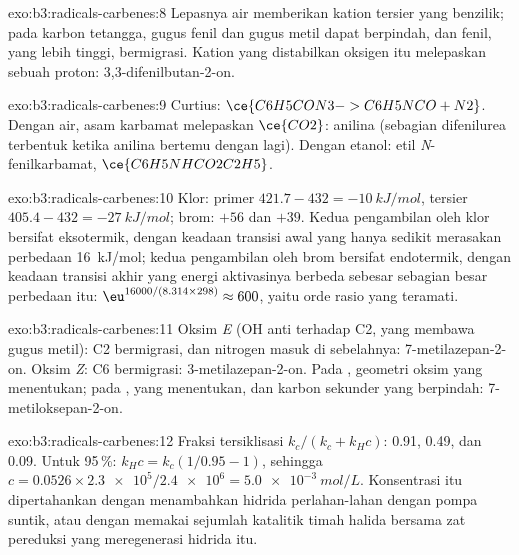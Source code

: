 \begin{solution}{exo:b3:radicals-carbenes:8}
Lepasnya air memberikan kation tersier yang benzilik; pada karbon tetangga, gugus fenil
dan gugus metil dapat berpindah, dan fenil, yang  lebih tinggi, bermigrasi. Kation
yang distabilkan oksigen itu melepaskan sebuah proton: 3,3-difenilbutan-2-on.
\end{solution}

\begin{solution}{exo:b3:radicals-carbenes:9}
Curtius: $\ce{C6H5CON3 -> C6H5NCO + N2}$. Dengan air, asam karbamat melepaskan $\ce{CO2}$: anilina
(sebagian difenilurea terbentuk ketika anilina bertemu dengan  lagi). Dengan etanol: etil
\textit{N}-fenilkarbamat, $\ce{C6H5NHCO2C2H5}$.
\end{solution}

\begin{solution}{exo:b3:radicals-carbenes:10}
Klor: primer $421.7 - 432 = \qty{-10}{kJ/mol}$, tersier $405.4 - 432 = \qty{-27}{kJ/mol}$; brom: $+56$ dan
$+39$. Kedua pengambilan oleh klor bersifat eksotermik, dengan keadaan transisi awal yang
hanya sedikit merasakan perbedaan \qty{16}{kJ/mol}; kedua pengambilan oleh brom bersifat endotermik,
dengan keadaan transisi akhir yang energi aktivasinya berbeda sebesar sebagian besar perbedaan itu:
$\eu^{16000/(8.314 \times 298)} \approx 600$, yaitu orde rasio yang teramati.
\end{solution}

\begin{solution}{exo:b3:radicals-carbenes:11}
Oksim \textit{E} (OH anti terhadap C2, yang membawa gugus metil): C2 bermigrasi, dan nitrogen masuk
di sebelahnya: 7-metilazepan-2-on. Oksim \textit{Z}: C6 bermigrasi: 3-metilazepan-2-on. Pada
, geometri oksim yang menentukan; pada ,  yang menentukan, dan karbon sekunder yang berpindah:
7-metiloksepan-2-on.
\end{solution}

\begin{solution}{exo:b3:radicals-carbenes:12}
Fraksi tersiklisasi $k_c/(k_c + k_H c)$: 0.91, 0.49, dan 0.09. Untuk 95\,\%: $k_Hc = k_c(1/0.95 - 1)$, sehingga
$c = 0.0526 \times \num{2.3e5}/\num{2.4e6} = \qty{5.0e-3}{mol/L}$. Konsentrasi itu dipertahankan dengan menambahkan hidrida perlahan-lahan dengan
pompa suntik, atau dengan memakai sejumlah katalitik timah halida bersama zat pereduksi
yang meregenerasi hidrida itu.
\end{solution}

